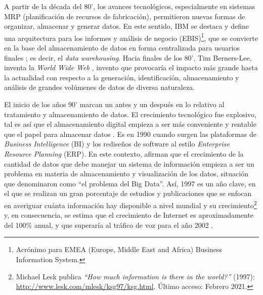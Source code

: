 \bigskip A partir de la década del 80’, los avances tecnológicos, especialmente en sistemas MRP (planificación de recursos de fabricación), permitieron nuevas formas de organizar, almacenar y generar datos. En este sentido, IBM se destaca y define una arquitectura para los informes y análisis de negocio (EBIS)\footnote{Acrónimo para EMEA (Europe, Middle East and Africa) Business Information System.}, que se convierte en la base del almacenamiento de datos en forma centralizada para usuarios finales \citep{devlin1988architecture}; es decir, el \textit{data warehousing}. Hacia finales de los 80’, Tim Berners-Lee, inventa la \textit{World Wide Web} \citep{berners1992world}, invento que provocaría el impacto más grande hasta la actualidad con respecto a la generación, identificación, almacenamiento y análisis de grandes volúmenes de datos de diversa naturaleza.

\bigskip El inicio de los años 90’ marcan un antes y un después en lo relativo al tratamiento y almacenamiento de datos. El crecimiento tecnológico fue explosivo, tal es así que el almacenamiento digital empieza a ser más conveniente y rentable que el papel para almacenar datos \citep{morris2003evolution}. Es en 1990 cuando surgen las plataformas de \textit{Business Intelligence} (BI) y los rediseños de software al estilo \textit{Enterprise Resource Planning} (ERP). En este contexto, \cite{cox1997application} afirman que el crecimiento de la cantidad de datos que debe manejar un sistema de información empieza a ser un problema en materia de almacenamiento y visualización de los datos, situación que denominaron como “el problema del Big Data”. Así, 1997 es un año clave, en el que se realizan un gran porcentaje de estudios y publicaciones que se enfocan en averiguar cuánta información hay disponible a nivel mundial y su crecimiento\footnote{Michael Lesk publica \textit{“How much information is there in the world?”} (1997): \url{http://www.lesk.com/mlesk/ksg97/ksg.html}. Último acceso: Febrero 2021.} y, en consecuencia, se estima que el crecimiento de Internet es aproximadamente del 100\% anual, y que superaría al tráfico de voz para el año 2002 \citep{coffman1998size}.

